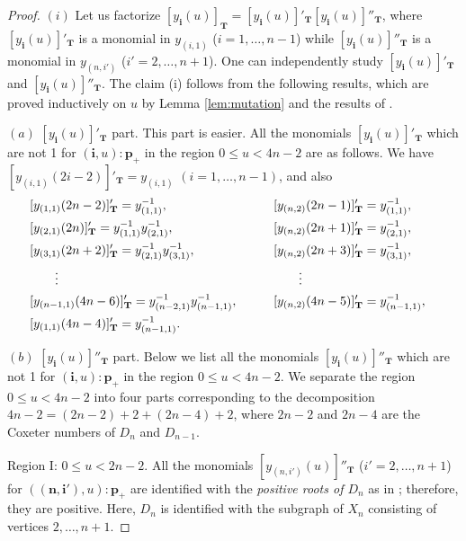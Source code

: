 \documentclass[pdftex]{sigma}
\numberwithin{equation}{section}
\theoremstyle{definition}
\begin{document}
\begin{proof}
$(i)$ Let us factorize $[y_{\mathbf{i}}(u)]_{\mathbf{T}}
=[y_{\mathbf{i}}(u)]'_{\mathbf{T}}
[y_{\mathbf{i}}(u)]''_{\mathbf{T}}$,
where
 $[y_{\mathbf{i}}(u)]'_{\mathbf{T}}$ is a monomial
in $y_{(i,1)}$ ($i=1,\dots,n-1$)
while
 $[y_{\mathbf{i}}(u)]''_{\mathbf{T}}$ is a monomial
in $y_{(n,i')}$ ($i'=2,\dots,n+1$).
One can independently study
$[y_{\mathbf{i}}(u)]'_{\mathbf{T}}$ and
$[y_{\mathbf{i}}(u)]''_{\mathbf{T}}$.
The claim  (i) follows from the following results,
which  are proved inductively on $u$
by Lemma \ref{lem:mutation} and the results of
\cite{Fomin03b,Fomin07}.

$(a)$ $[y_{\mathbf{i}}(u)]'_{\mathbf{T}}$ part.
This part is easier.
All the monomials $[y_{\mathbf{i}}(u)]'_{\mathbf{T}}$
 which are not 1 for $(\mathbf{i},u):\mathbf{p}_+$
in the region $0 \leq u < 4n-2$ are as follows.
We have $[y_{(i,1)}(2i-2)]'_{\mathbf{T}}=y_{(i,1)}$
$(i=1,\dots,n-1)$,
and also
\begin{alignat}{3}
& [y_{(1,1)}(2n-2)]'_{\mathbf{T}}=y_{(1,1)}^{-1},\qquad &&
[y_{(n,2)}(2n-1)]'_{\mathbf{T}}=y_{(1,1)}^{-1},&\notag\\
& [y_{(2,1)}(2n)]'_{\mathbf{T}}=y_{(1,1)}^{-1}y_{(2,1)}^{-1},\qquad &&
[y_{(n,2)}(2n+1)]'_{\mathbf{T}}=y_{(2,1)}^{-1},&\notag\\
\label{eq:y'part}
& [y_{(3,1)}(2n+2)]'_{\mathbf{T}}=y_{(2,1)}^{-1}y_{(3,1)}^{-1},\qquad &&
[y_{(n,2)}(2n+3)]'_{\mathbf{T}}=y_{(3,1)}^{-1},&\\
&\qquad \vdots & &\qquad \vdots & \notag\\
& [y_{(n-1,1)}(4n-6)]'_{\mathbf{T}}=y_{(n-2,1)}^{-1}y_{(n-1,1)}^{-1},\qquad &&
[y_{(n,2)}(4n-5)]'_{\mathbf{T}}=y_{(n-1,1)}^{-1},&\notag\\
& [y_{(1,1)}(4n-4)]'_{\mathbf{T}}=y_{(n-1,1)}^{-1}.&&& \notag
\end{alignat}

$(b)$  $[y_{\mathbf{i}}(u)]''_{\mathbf{T}}$ part.
Below we list all the monomials $[y_{\mathbf{i}}(u)]''_{\mathbf{T}}$
which are not 1 for $(\mathbf{i},u):\mathbf{p}_+$
in the region $0 \leq u < 4n-2$.
We separate the region $0 \leq u < 4n-2$ into four parts
corresponding to the decomposition
$4n-2=(2n-2)+2+(2n-4)+2$,
where $2n-2$ and $2n-4$ are the Coxeter numbers
of $D_{n}$ and $D_{n-1}$.


Region I: $0\leq u < 2n-2$.
All the  monomials
$[y_{(n,i')}(u)]''_{\mathbf{T}}$ ($i'=2,\dots,n+1$)
 for $(\mathbf{(n,i')},u):\mathbf{p}_+$
are identif\/ied with
the {\em positive roots of $D_n$} as in
\cite[Proposition 10.7]{Fomin07};
therefore, they are positive.
Here, $D_{n}$ is identif\/ied with the subgraph of $X_n$
consisting of vertices $2, \dots, n+1$.



\end{proof}
\end{document}
